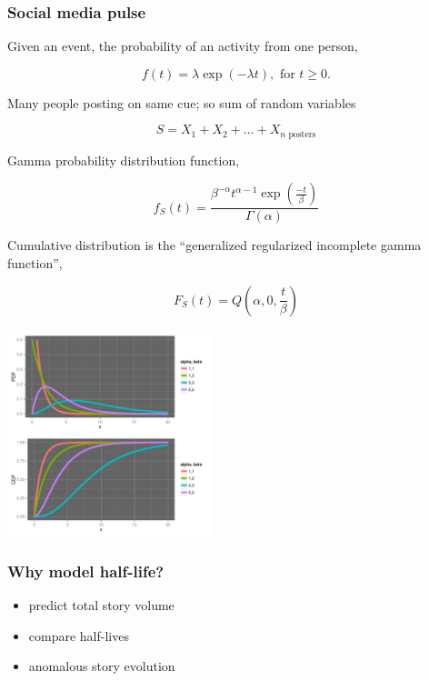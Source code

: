 \documentclass{beamer}
\begin{document}
\begin{frame}
\frametitle{Social media pulse} 
Given an event, the probability of an activity from one person,

\begin{equation*}
f(t) = \lambda \exp(-\lambda t), \text{ for } t \geq 0.
\end{equation*}

Many people posting on same cue; so sum of random variables 

\begin{equation*}
S = X_1 + X_2 + \ldots + X_{n \text{ posters}}
\end{equation*}

Gamma probability distribution function,

\begin{equation*}
f_S(t) = \frac{ \beta^{-\alpha} t^{\alpha-1} \exp( \frac{-t}{\beta}) } {\Gamma(\alpha)}
\end{equation*}

Cumulative distribution is the ``generalized regularized incomplete gamma function'',

\begin{equation*}
F_S(t) = Q(\alpha, 0, \frac{ t}{\beta})
\end{equation*}
\end{frame}


\begin{frame}
  \begin{center}
   \includegraphics[height=6cm]{./imgs/SMP_gammadist.pdf}
  \end{center}
\end{frame}

\begin{frame}\frametitle{Why model half-life?}
{\Large
\begin{itemize}
\item predict total story volume
\item compare half-lives
\item anomalous story evolution
\end{itemize}
}
\end{frame}
\end{document}
